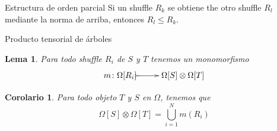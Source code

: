 \documentclass[12pt,aspectratio=169]{beamer}
\numberwithin{equation}{section}
\newtheorem{corol}[teo]{Corolario}
\newtheorem{lema}[teo]{Lema}
\theoremstyle{definition}
\begin{document}
{\begin{frame}{Estructura de orden parcial}
    Si un shuffle $R_k$ se obtiene the otro shuffle $R_l$ mediante la norma de arriba, entonces $R_l\le R_k$.
\end{frame}

\begin{frame}{Producto tensorial de \'arboles}
    \begin{lema}
        Para todo shuffle $R_i$ de $S$ y $T$ tenemos un monomorfismo
        $$
            \xymatrix{
                m\colon\Omega[R_i] \ar@{>->}[r] & \Omega[S]\otimes\Omega[T]
            }
        $$
    \end{lema}

    \begin{corol}
        Para todo objeto $T$ y $S$ en $\Omega$, tenemos que
        $$
            \Omega[S]\otimes\Omega[T] = \bigcup_{i=1}^{N} m(R_i)
        $$
    \end{corol}
\end{frame}

}
\end{document}
